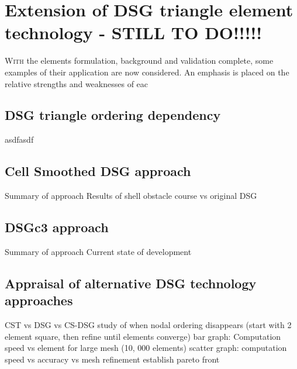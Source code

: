 



\chapter{Extension of DSG triangle element technology - STILL TO DO!!!!!}
\label{chap:chapter_application}

\renewcommand{\Thema}{Extension of DSG triangle element technology}

\lettrine[lines=2]{W}{ith} the elements formulation, background and validation complete, some examples of their application are now considered. An emphasis is placed on the relative strengths and weaknesses of eac

\section{DSG triangle ordering dependency}
asdfasdf

\section{Cell Smoothed DSG approach}
Summary of approach
Results of shell obstacle course vs original DSG

\section{DSGc3 approach}
Summary of approach
Current state of development

\section{Appraisal of alternative DSG technology approaches}
CST vs DSG vs CS-DSG
study of when nodal ordering disappears (start with 2 element square, then refine until elements converge)
bar graph: Computation speed vs element for large mesh (10, 000 elements)
scatter graph: computation speed vs accuracy vs mesh refinement
establish pareto front

